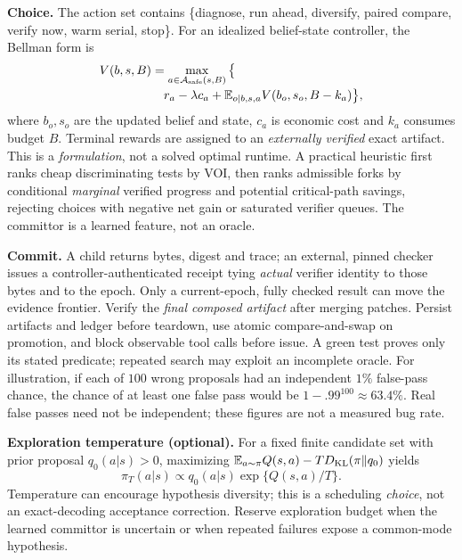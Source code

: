 \documentclass[10pt,twocolumn]{article}
\newcommand{\Ee}{\mathbb E}
\newcommand{\head}[1]{\textbf{\color{ink}#1}}
\begin{document}
\head{Choice.} The action set contains \{diagnose, run ahead, diversify, paired compare, verify now, warm serial, stop\}. For an idealized belief-state controller, the Bellman form is
\begin{equation}\label{eq:bellman}
\begin{aligned}
V(b,s,B)&=\max_{a\in\mathcal A_{\rm safe}(s,B)}\big\{\\[-2pt]
&\quad r_a-\lambda c_a+\Ee_{o\mid b,s,a}
V(b_o,s_o,B-k_a)\big\},
\end{aligned}
\end{equation}
where $b_o,s_o$ are the updated belief and state, $c_a$ is economic cost and $k_a$ consumes budget $B$. Terminal rewards are assigned to an \emph{externally verified} exact artifact. This is a \emph{formulation}, not a solved optimal runtime. A practical heuristic first ranks cheap discriminating tests by VOI, then ranks admissible forks by conditional \emph{marginal} verified progress and potential critical-path savings, rejecting choices with negative net gain or saturated verifier queues. The committor is a learned feature, not an oracle.

\head{Commit.} A child returns bytes, digest and trace; an external, pinned checker issues a controller-authenticated receipt tying \emph{actual} verifier identity to those bytes and to the epoch. Only a current-epoch, fully checked result can move the evidence frontier. Verify the \emph{final composed artifact} after merging patches. Persist artifacts and ledger before teardown, use atomic compare-and-swap on promotion, and block observable tool calls before issue. A green test proves only its stated predicate; repeated search may exploit an incomplete oracle. For illustration, if each of $100$ wrong proposals had an independent $1\%$ false-pass chance, the chance of at least one false pass would be $1-.99^{100}\approx63.4\%$. Real false passes need not be independent; these figures are not a measured bug rate.

\head{Exploration temperature (optional).} For a fixed finite candidate set with prior proposal $q_0(a|s)>0$, maximizing $\Ee_{a\sim\pi}Q(s,a)-T D_{\rm KL}(\pi\Vert q_0)$ yields
\begin{equation}\label{eq:gibbs}
 \pi_T(a|s)\propto q_0(a|s)\exp\{Q(s,a)/T\}.
\end{equation}
Temperature can encourage hypothesis diversity; this is a scheduling \emph{choice}, not an exact-decoding acceptance correction. Reserve exploration budget when the learned committor is uncertain or when repeated failures expose a common-mode hypothesis.
\end{document}
